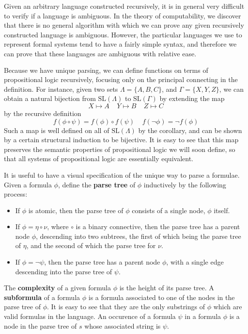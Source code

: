 Given an arbitrary language constructed recursively, it is in general very difficult to verify if a language is ambiguous. In the theory of computability, we discover that there is no general algorithm with which we can prove any given recursively constructed language is ambiguous. However, the particular languages we use to represent formal systems tend to have a fairly simple syntax, and therefore we can prove that these languages are ambiguous with relative ease.

Because we have unique parsing, we can define functions on terms of propositional logic recursively, focusing only on the principal connecting in the definition. For instance, given two sets $\Lambda = \{ A, B, C \}$, and $\Gamma = \{ X, Y, Z \}$, we can obtain a natural bijection from $\text{SL}(\Lambda)$ to $\text{SL}(\Gamma)$ by extending the map
%
\[ X \mapsto A\ \ \ \ \ Y \mapsto B\ \ \ \ \ Z \mapsto C \]
%
by the recursive definition
%
\[ f(\phi \circ \psi) = f(\phi) \circ f(\psi)\ \ \ \ \ f(\neg \phi) = \neg f(\phi) \]
%
Such a map is well defined on all of $\text{SL}(\Lambda)$ by the corollary, and can be shown by a certain structural induction to be bijective. It is easy to see that this map preserves the semantic properties of propositional logic we will soon define, so that all systems of propositional logic are essentially equivalent.

It is useful to have a visual specification of the unique way to parse a formulae. Given a formula $\phi$, define the {\bf parse tree} of $\phi$ inductively by the following process:
%
\begin{itemize}
    \item If $\phi$ is atomic, then the parse tree of $\phi$ consists of a single node, $\phi$ itself.
    \item If $\phi = \eta \circ \nu$, where $\circ$ is a binary connective, then the parse tree has a parent node $\phi$, descending into two subtrees, the first of which being the parse tree of $\eta$, and the second of which the parse tree for $\nu$.
    \item If $\phi = \neg \psi$, then the parse tree has a parent node $\phi$, with a single edge descending into the parse tree of $\psi$.
\end{itemize}
%
The {\bf complexity} of a given formula $\phi$ is the height of its parse tree. A {\bf subformula} of a formula $\phi$ is a formula associated to one of the nodes in the parse tree of $\phi$. It is easy to see that they are the only substrings of $\phi$ which are valid formulas in the language. An occurence of a formula $\psi$ in a formula $\phi$ is a node in the parse tree of $s$ whose associated string is $\psi$.

